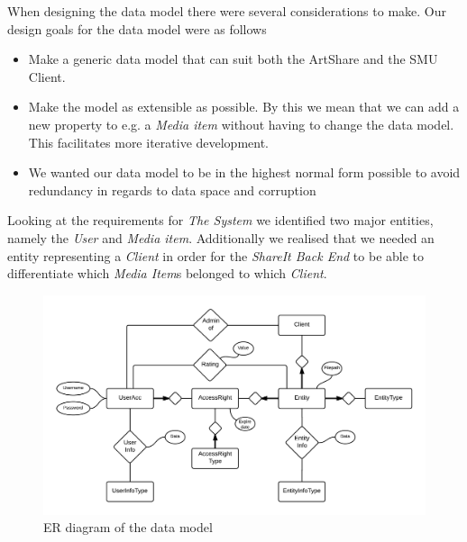 \documentclass[../report.tex]{subfiles}
\begin{document}
When designing the data model there were several considerations to make. Our design goals for the data model were as follows
\begin{itemize}
\item Make a generic data model that can suit both the ArtShare and the SMU Client.
\item Make the model as extensible as possible. By this we mean that we can add a new property to e.g. a \textit{Media item} without having to change the data model. This facilitates more iterative development.
\item We wanted our data model to be in the highest normal form possible to avoid redundancy in regards to data space and corruption
\end{itemize} 






Looking at the requirements for \textit{The System} we identified two major entities, namely the \textit{User} and \textit{Media item}. Additionally we realised that we needed an entity representing a \textit{Client} in order for the \textit{ShareIt Back End} to be able to differentiate which \textit{Media Item}s belonged to which \textit{Client}. \\

\begin{figure}[H]
\includegraphics[width=\linewidth]{img/ER.png}
\caption{ER diagram of the data model}
\label{fig:use case diagram}
\end{figure}
\end{document}
